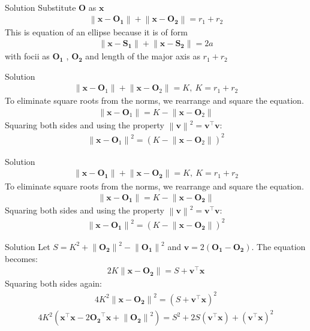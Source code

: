 \documentclass{beamer}
\let\vec\mathbf
\providecommand{\brak}[1]{\ensuremath{\left(#1\right)}}
\theoremstyle{remark}
\providecommand{\norm}[1]{\left\lVert#1\right\rVert}
\begin{document}
\begin{frame}{Solution}
Substitute $\vec{O}$ as $\vec{x}$
\begin{align}
    \norm{\vec{x} - \vec{O_1}} + \norm{\vec{x} - \vec{O_2}} = r_1 + r_2
\end{align}
This is equation of an ellipse because it is of form 
\begin{align}
    \norm{\vec{x} - \vec{S_1}} + \norm{\vec{x} - \vec{S_2}} = 2a
\end{align}
with focii  as $\vec{O_1}$ , $\vec{O_2}$ and length of the major axis as $r_1 + r_2$
\end{frame}
\begin{frame}{Solution}
\begin{align}
    \norm{\vec{x} - \vec{O}_1} + \norm{\vec{x} - \vec{O}_2} = K, \ K=r_1+r_2
\end{align}
To eliminate square roots from the norms, we rearrange and square the equation.
\begin{align}
 \norm{\vec{x} - \vec{O}_1} = K - \norm{\vec{x} - \vec{O}_2}
\end{align}
Squaring both sides and using the property $\norm{\vec{v}}^2 = \vec{v}^{\top}\vec{v}$:
\begin{align}
 \norm{\vec{x} - \vec{O}_1}^2 = (K - \norm{\vec{x} - \vec{O}_2})^2
\end{align}
\end{frame}


\begin{frame}{Solution}
\begin{align}
    \norm{\vec{x} - \vec{O_1}} + \norm{\vec{x} - \vec{O_2}} = K, \ K=r_1+r_2
\end{align}
To eliminate square roots from the norms, we rearrange and square the equation.
\begin{align}
 \norm{\vec{x} - \vec{O_1}} = K - \norm{\vec{x} - \vec{O_2}}
\end{align}
Squaring both sides and using the property $\norm{\vec{v}}^2 = \vec{v}^{\top}\vec{v}$:
\begin{align}
 \norm{\vec{x} - \vec{O_1}}^2 = \brak{K - \norm{\vec{x} - \vec{O_2}}}^2
\end{align}
\end{frame}
\begin{frame}{Solution}
Let $S = K^2 + \norm{\vec{O_2}}^2 - \norm{\vec{O_1}}^2$ and $\vec{v} = 2\brak{\vec{O_1} - \vec{O_2}}$. The equation becomes:
\begin{align}
 2K\norm{\vec{x} - \vec{O_2}} = S + \vec{v}^{\top}\vec{x}
\end{align}
Squaring both sides again:
\begin{align}
 4K^2\norm{\vec{x} - \vec{O_2}}^2 = (S + \vec{v}^{\top}\vec{x})^2
\end{align}
\begin{align}
 4K^2\brak{\vec{x}^{\top}\vec{x} - 2\vec{O_2}^{\top}\vec{x} + \norm{\vec{O_2}}^2} = S^2 + 2S\brak{\vec{v}^{\top}\vec{x}} + \brak{\vec{v}^{\top}\vec{x}}^2
\end{align}
\end{frame}
\end{document}
